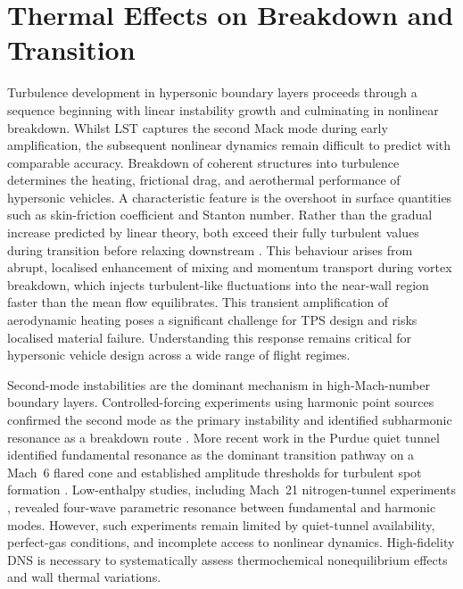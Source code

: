 \chapter{Thermal Effects on Breakdown and Transition}\label{chapter:breakdown}

Turbulence development in hypersonic boundary layers proceeds through a sequence beginning with linear instability growth and culminating in nonlinear breakdown. Whilst \gls{LST} captures the second Mack mode during early amplification, the subsequent nonlinear dynamics remain difficult to predict with comparable accuracy. Breakdown of coherent structures into turbulence determines the heating, frictional drag, and aerothermal performance of hypersonic vehicles. A characteristic feature is the overshoot in surface quantities such as skin-friction coefficient and Stanton number. Rather than the gradual increase predicted by linear theory, both exceed their fully turbulent values during transition before relaxing downstream \citep{Holden1972}. This behaviour arises from abrupt, localised enhancement of mixing and momentum transport during vortex breakdown, which injects turbulent-like fluctuations into the near-wall region faster than the mean flow equilibrates. This transient amplification of aerodynamic heating poses a significant challenge for \gls{TPS} design and risks localised material failure. Understanding this response remains critical for hypersonic vehicle design across a wide range of flight regimes.

Second-mode instabilities are the dominant mechanism in high-Mach-number boundary layers. Controlled-forcing experiments using harmonic point sources confirmed the second mode as the primary instability and identified subharmonic resonance as a breakdown route \citep{Shiplyuk2003,Bountin2008}. More recent work in the Purdue quiet tunnel identified fundamental resonance as the dominant transition pathway on a Mach~6 flared cone \citep{Chynoweth2014} and established amplitude thresholds for turbulent spot formation \citep{Casper2011,Casper2012}. Low-enthalpy studies, including Mach~21 nitrogen-tunnel experiments \citep{Mironov2000}, revealed four-wave parametric resonance between fundamental and harmonic modes. However, such experiments remain limited by quiet-tunnel availability, perfect-gas conditions, and incomplete access to nonlinear dynamics. High-fidelity \gls{DNS} is necessary to systematically assess thermochemical nonequilibrium effects and wall thermal variations.

